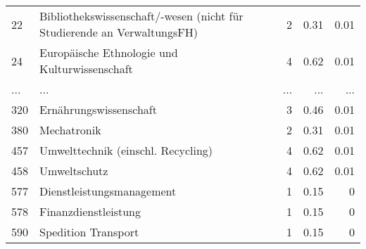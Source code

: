 \begin{longtable}{lXrrr}
        22 & \multicolumn{1}{X}{Bibliothekswissenschaft/-wesen (nicht für Studierende an VerwaltungsFH)} & %
          \num{2} &
          \num[round-mode=places,round-precision=2]{0,31} &
          \num[round-mode=places,round-precision=2]{0,01} \\
        24 & \multicolumn{1}{X}{Europäische Ethnologie und Kulturwissenschaft} & %
          \num{4} &
          \num[round-mode=places,round-precision=2]{0,62} &
          \num[round-mode=places,round-precision=2]{0,01} \\
       ... & ... & ... & ... & ... \\
        320 & \multicolumn{1}{X}{Ernährungswissenschaft} & %
          \num{3} &
          \num[round-mode=places,round-precision=2]{0,46} &
          \num[round-mode=places,round-precision=2]{0,01} \\

        380 & \multicolumn{1}{X}{Mechatronik} & %
          \num{2} &
          \num[round-mode=places,round-precision=2]{0,31} &
          \num[round-mode=places,round-precision=2]{0,01} \\

        457 & \multicolumn{1}{X}{Umwelttechnik (einschl. Recycling)} & %
          \num{4} &
          \num[round-mode=places,round-precision=2]{0,62} &
          \num[round-mode=places,round-precision=2]{0,01} \\

        458 & \multicolumn{1}{X}{Umweltschutz} & %
          \num{4} &
          \num[round-mode=places,round-precision=2]{0,62} &
          \num[round-mode=places,round-precision=2]{0,01} \\

        577 & \multicolumn{1}{X}{Dienstleistungsmanagement} & %
          \num{1} &
          \num[round-mode=places,round-precision=2]{0,15} &
          \num[round-mode=places,round-precision=2]{0} \\

        578 & \multicolumn{1}{X}{Finanzdienstleistung} & %
          \num{1} &
          \num[round-mode=places,round-precision=2]{0,15} &
          \num[round-mode=places,round-precision=2]{0} \\

        590 & \multicolumn{1}{X}{Spedition Transport} & %
          \num{1} &
          \num[round-mode=places,round-precision=2]{0,15} &
          \num[round-mode=places,round-precision=2]{0} \\


\end{longtable}
